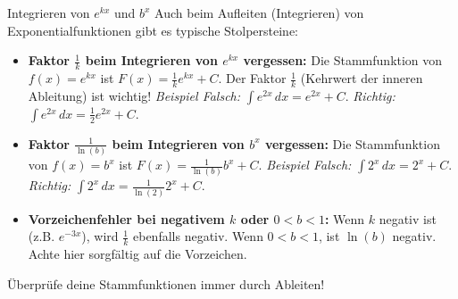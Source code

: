 \begin{fehlerboxumgebung}{Integrieren von $e^{kx}$ und $b^x$}
Auch beim Aufleiten (Integrieren) von Exponentialfunktionen gibt es typische Stolpersteine:
\begin{itemize}
    \item \textbf{Faktor $\frac{1}{k}$ beim Integrieren von $e^{kx}$ vergessen:} Die Stammfunktion von $f(x)=e^{kx}$ ist $F(x) = \frac{1}{k}e^{kx} + C$. Der Faktor $\frac{1}{k}$ (Kehrwert der inneren Ableitung) ist wichtig!
    \textit{Beispiel Falsch:} $\int e^{2x} \,dx = e^{2x} + C$. \textit{Richtig:} $\int e^{2x} \,dx = \frac{1}{2}e^{2x} + C$.
    \item \textbf{Faktor $\frac{1}{\ln(b)}$ beim Integrieren von $b^x$ vergessen:} Die Stammfunktion von $f(x)=b^x$ ist $F(x) = \frac{1}{\ln(b)}b^x + C$.
    \textit{Beispiel Falsch:} $\int 2^x \,dx = 2^x + C$. \textit{Richtig:} $\int 2^x \,dx = \frac{1}{\ln(2)}2^x + C$.
    \item \textbf{Vorzeichenfehler bei negativem $k$ oder $0 < b < 1$:} Wenn $k$ negativ ist (z.B. $e^{-3x}$), wird $\frac{1}{k}$ ebenfalls negativ. Wenn $0 < b < 1$, ist $\ln(b)$ negativ. Achte hier sorgfältig auf die Vorzeichen.
\end{itemize}
Überprüfe deine Stammfunktionen immer durch Ableiten!
\end{fehlerboxumgebung}

